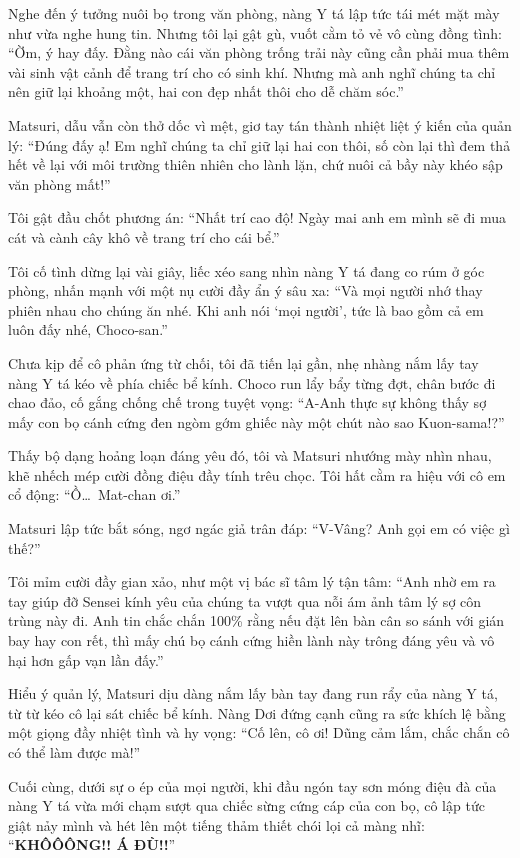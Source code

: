 \documentclass[../main.tex]{subfiles}
\begin{document}
Nghe đến ý tưởng nuôi bọ trong văn phòng, nàng Y tá lập tức tái mét mặt mày như vừa nghe hung tin. Nhưng tôi lại gật gù, vuốt cằm tỏ vẻ vô cùng đồng tình:
``Ờm, ý hay đấy. Đằng nào cái văn phòng trống trải này cũng cần phải mua thêm vài sinh vật cảnh để trang trí cho có sinh khí. Nhưng mà anh nghĩ chúng ta chỉ nên giữ lại khoảng một, hai con đẹp nhất thôi cho dễ chăm sóc.''

Matsuri, dẫu vẫn còn thở dốc vì mệt, giơ tay tán thành nhiệt liệt ý kiến của quản lý:
``Đúng đấy ạ! Em nghĩ chúng ta chỉ giữ lại hai con thôi, số còn lại thì đem thả hết về lại với môi trường thiên nhiên cho lành lặn, chứ nuôi cả bầy này khéo sập văn phòng mất!''

Tôi gật đầu chốt phương án:
``Nhất trí cao độ! Ngày mai anh em mình sẽ đi mua cát và cành cây khô về trang trí cho cái bể.''

Tôi cố tình dừng lại vài giây, liếc xéo sang nhìn nàng Y tá đang co rúm ở góc phòng, nhấn mạnh với một nụ cười đầy ẩn ý sâu xa:
``Và mọi người nhớ thay phiên nhau cho chúng ăn nhé. Khi anh nói `mọi người', tức là bao gồm cả em luôn đấy nhé, Choco-san.''

Chưa kịp để cô phản ứng từ chối, tôi đã tiến lại gần, nhẹ nhàng nắm lấy tay nàng Y tá kéo về phía chiếc bể kính. Choco run lẩy bẩy từng đợt, chân bước đi chao đảo, cố gắng chống chế trong tuyệt vọng:
``A-Anh thực sự không thấy sợ mấy con bọ cánh cứng đen ngòm gớm ghiếc này một chút nào sao Kuon-sama!?''

Thấy bộ dạng hoảng loạn đáng yêu đó, tôi và Matsuri nhướng mày nhìn nhau, khẽ nhếch mép cười đồng điệu đầy tính trêu chọc. Tôi hất cằm ra hiệu với cô em cổ động:
``Ồ\dots\ Mat-chan ơi.''

Matsuri lập tức bắt sóng, ngơ ngác giả trân đáp:
``V-Vâng? Anh gọi em có việc gì thế?''

Tôi mỉm cười đầy gian xảo, như một vị bác sĩ tâm lý tận tâm:
``Anh nhờ em ra tay giúp đỡ Sensei kính yêu của chúng ta vượt qua nỗi ám ảnh tâm lý sợ côn trùng này đi. Anh tin chắc chắn 100\% rằng nếu đặt lên bàn cân so sánh với gián bay hay con rết, thì mấy chú bọ cánh cứng hiền lành này trông đáng yêu và vô hại hơn gấp vạn lần đấy.''

Hiểu ý quản lý, Matsuri dịu dàng nắm lấy bàn tay đang run rẩy của nàng Y tá, từ từ kéo cô lại sát chiếc bể kính. Nàng Dơi đứng cạnh cũng ra sức khích lệ bằng một giọng đầy nhiệt tình và hy vọng:
``Cố lên, cô ơi! Dũng cảm lắm, chắc chắn cô có thể làm được mà!''

Cuối cùng, dưới sự o ép của mọi người, khi đầu ngón tay sơn móng điệu đà của nàng Y tá vừa mới chạm sượt qua chiếc sừng cứng cáp của con bọ, cô lập tức giật nảy mình và hét lên một tiếng thảm thiết chói lọi cả màng nhĩ:
``\textbf{KHÔÔÔNG!! Á ĐÙ!!}''
\end{document}

